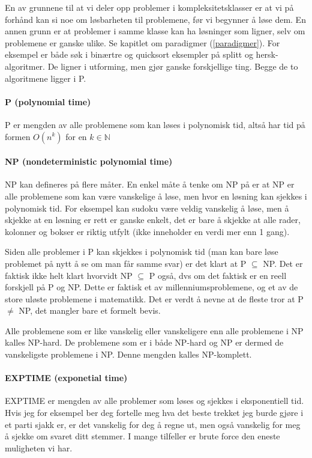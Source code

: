 En av grunnene til at vi deler opp problemer i kompleksitetsklasser er at vi på forhånd kan si noe om løsbarheten til problemene, før vi begynner å løse dem. En annen grunn er at problemer i samme klasse kan ha løsninger som ligner, selv om problemene er ganske ulike. Se kapitlet om paradigmer (\ref{paradigmer}). For eksempel er både søk i binærtre og quicksort eksempler på splitt og hersk-algoritmer. De ligner i utforming, men gjør ganske forskjellige ting. Begge de to algoritmene ligger i P. 



\paragraph{P (polynomial time)}
P er mengden av alle problemene som kan løses i polynomisk tid, altså har tid på formen $ O(n^k) $ for en $ k \in \mathbb{N} $

\paragraph{NP (nondeterministic polynomial time)}
NP kan defineres på flere måter. En enkel måte å tenke om NP på er at NP er alle problemene som kan være vanskelige å løse, men hvor en løsning kan sjekkes i polynomisk tid. For eksempel kan sudoku være veldig vanskelig å løse, men å skjekke at en løsning er rett er ganske enkelt, det er bare å skjekke at alle rader, kolonner og bokser er riktig utfylt (ikke inneholder en verdi mer enn 1 gang). 

Siden alle problemer i P kan skjekkes i polynomisk tid (man kan bare løse problemet på nytt å se om man får samme svar) er det klart at P $ \subseteq $ NP. Det er faktisk ikke helt klart hvorvidt NP $ \subseteq $ P også, dvs om det faktisk er en reell forskjell på P og NP. Dette er faktisk et av millenniumsproblemene, og et av de store uløste problemene i matematikk. Det er verdt å nevne at de fleste tror at P $ \neq $ NP, det mangler bare et formelt bevis.

Alle problemene som er like vanskelig eller vanskeligere enn alle problemene i NP kalles NP-hard. De problemene som er i både NP-hard og NP er dermed de vanskeligste problemene i NP. Denne mengden kalles NP-komplett. 

\paragraph{EXPTIME (exponetial time)}
EXPTIME er mengden av alle problemer som løses og sjekkes i eksponentiell tid. Hvis jeg for eksempel ber deg fortelle meg hva det beste trekket jeg burde gjøre i et parti sjakk er, er det vanskelig for deg å regne ut, men også vanskelig for meg å sjekke om svaret ditt stemmer. I mange tilfeller er brute force den eneste muligheten vi har. 

